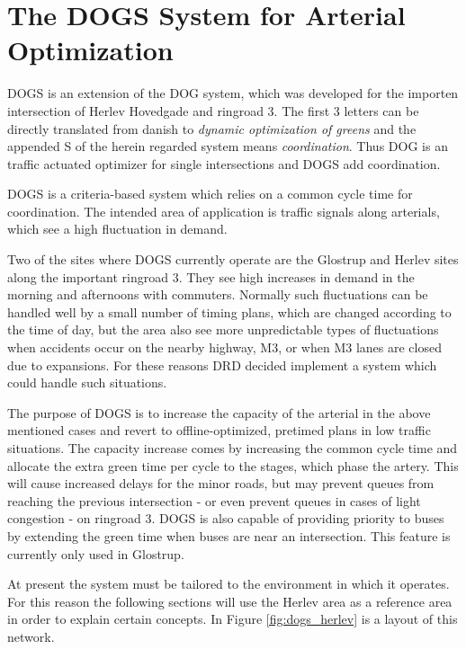\section{The DOGS System for Arterial Optimization}
\label{dogs}
DOGS is an extension of the DOG system, which was developed for the importen intersection of Herlev Hovedgade and ringroad 3. The first 3 letters can be directly translated from danish to \textit{dynamic optimization of greens} and the appended S of the herein regarded system means \textit{coordination}. Thus DOG is an traffic actuated optimizer for single intersections and DOGS add coordination.

DOGS is a criteria-based system which relies on a common cycle time for coordination. The intended area of application is traffic signals along arterials, which see a high fluctuation in demand. 

Two of the sites where DOGS currently operate are the Glostrup and Herlev sites along the important ringroad 3. They see high increases in demand in the morning and afternoons with commuters. Normally such fluctuations can be handled well by a small number of timing plans, which are changed according to the time of day, but the area also see more unpredictable types of fluctuations when accidents occur on the nearby highway, M3, or when M3 lanes are closed due to expansions. For these reasons DRD decided implement a system which could handle such situations.

The purpose of DOGS is to increase the capacity of the arterial in the above mentioned cases and revert to offline-optimized, pretimed plans in low traffic situations. The capacity increase comes by increasing the common cycle time and allocate the extra green time per cycle to the stages, which phase the artery. This will cause increased delays for the minor roads, but may prevent queues from reaching the previous intersection - or even prevent queues in cases of light congestion - on ringroad 3.
DOGS is also capable of providing priority to buses by extending the green time when buses are near an intersection. This feature is currently only used in Glostrup.

At present the system must be tailored to the environment in which it operates. For this reason the following sections will use the Herlev area as a reference area in order to explain certain concepts. In Figure \ref{fig:dogs_herlev} is a layout of this network.


